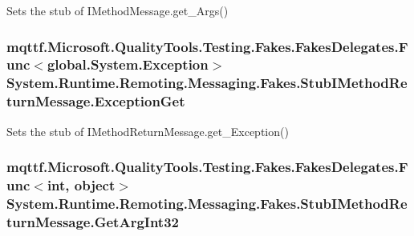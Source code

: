 Sets the stub of I\-Method\-Message.\-get\-\_\-\-Args()

\hypertarget{class_system_1_1_runtime_1_1_remoting_1_1_messaging_1_1_fakes_1_1_stub_i_method_return_message_a2148a780b334f85e90c51f74d08a4cd7}{
\subsubsection[{Exception\-Get}]{\setlength{\rightskip}{0pt plus 5cm}mqttf.\-Microsoft.\-Quality\-Tools.\-Testing.\-Fakes.\-Fakes\-Delegates.\-Func$<$global.\-System.\-Exception$>$ System.\-Runtime.\-Remoting.\-Messaging.\-Fakes.\-Stub\-I\-Method\-Return\-Message.\-Exception\-Get}}\label{class_system_1_1_runtime_1_1_remoting_1_1_messaging_1_1_fakes_1_1_stub_i_method_return_message_a2148a780b334f85e90c51f74d08a4cd7}


Sets the stub of I\-Method\-Return\-Message.\-get\-\_\-\-Exception()

\hypertarget{class_system_1_1_runtime_1_1_remoting_1_1_messaging_1_1_fakes_1_1_stub_i_method_return_message_a357ec218838cfadefcea49509a1cb5f7}{
\subsubsection[{Get\-Arg\-Int32}]{\setlength{\rightskip}{0pt plus 5cm}mqttf.\-Microsoft.\-Quality\-Tools.\-Testing.\-Fakes.\-Fakes\-Delegates.\-Func$<$int, object$>$ System.\-Runtime.\-Remoting.\-Messaging.\-Fakes.\-Stub\-I\-Method\-Return\-Message.\-Get\-Arg\-Int32}}\label{class_system_1_1_runtime_1_1_remoting_1_1_messaging_1_1_fakes_1_1_stub_i_method_return_message_a357ec218838cfadefcea49509a1cb5f7}


